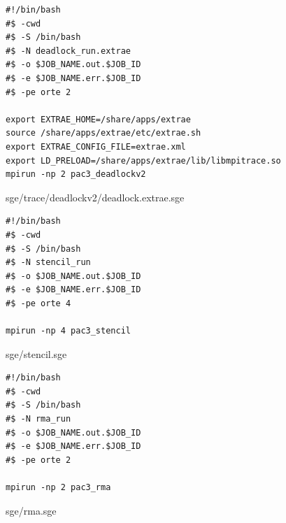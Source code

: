 \documentclass[12pt]{article}
\begin{document}
\begin{figure}[h!]
	\begin{verbatim}
#!/bin/bash
#$ -cwd
#$ -S /bin/bash
#$ -N deadlock_run.extrae
#$ -o $JOB_NAME.out.$JOB_ID
#$ -e $JOB_NAME.err.$JOB_ID
#$ -pe orte 2

export EXTRAE_HOME=/share/apps/extrae
source /share/apps/extrae/etc/extrae.sh
export EXTRAE_CONFIG_FILE=extrae.xml
export LD_PRELOAD=/share/apps/extrae/lib/libmpitrace.so
mpirun -np 2 pac3_deadlockv2
	\end{verbatim}
	\caption{sge/trace/deadlockv2/deadlock.extrae.sge}\label{code:deadlockv2tsge}
\end{figure}

\newpage

\begin{figure}[h!]
	\begin{verbatim}
#!/bin/bash
#$ -cwd
#$ -S /bin/bash
#$ -N stencil_run
#$ -o $JOB_NAME.out.$JOB_ID
#$ -e $JOB_NAME.err.$JOB_ID
#$ -pe orte 4

mpirun -np 4 pac3_stencil
	\end{verbatim}
	\caption{sge/stencil.sge}\label{code:stencilsge}
\end{figure}

\begin{figure}[h!]
	\begin{verbatim}
#!/bin/bash
#$ -cwd
#$ -S /bin/bash
#$ -N rma_run
#$ -o $JOB_NAME.out.$JOB_ID
#$ -e $JOB_NAME.err.$JOB_ID
#$ -pe orte 2

mpirun -np 2 pac3_rma
	\end{verbatim}
	\caption{sge/rma.sge}\label{code:rmasge}
\end{figure}
\end{document}

